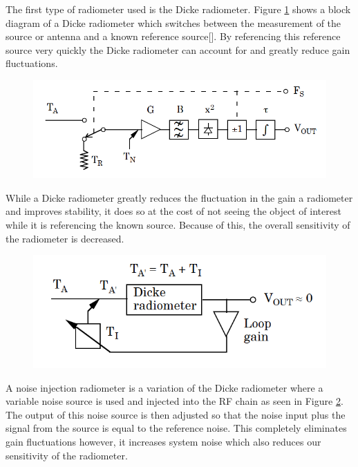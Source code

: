 The first type of radiometer used is the Dicke radiometer.  Figure \ref{dicke_radiometer} shows a block diagram of a Dicke radiometer which switches between the measurement of the source or antenna and a known reference source[\cite{Dicke}].  By referencing this reference source very quickly the Dicke radiometer can account for and greatly reduce gain fluctuations.  

{\begin{figure}[h!tb] 
\centering
\includegraphics[width=\textwidth]{Images/Dicke_block.png}
\label{dicke_radiometer}
\end{figure}
}

While a Dicke radiometer greatly reduces the fluctuation in the gain a radiometer and improves stability, it does so at the cost of not seeing the object of interest while it is referencing the known source.  Because of this, the overall sensitivity of the radiometer is decreased.

{\begin{figure}[h!tb] 
\centering
\includegraphics[width=\textwidth]{Images/NoiseInj_block.png}
\label{NoiseInj_radiometer}
\end{figure}
}

A noise injection radiometer is a variation of the Dicke radiometer where a variable noise source is used and injected into the RF chain as seen in Figure \ref{NoiseInj_radiometer}.  The output of this noise source is then adjusted so that the noise input plus the signal from the source is equal to the reference noise.  This completely eliminates gain fluctuations however, it increases system noise which also reduces our sensitivity of the radiometer.

